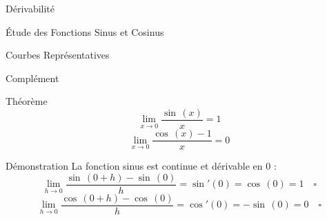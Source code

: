 \documentclass{cours}
\begin{document}
\begin{Gpartie}{Dérivabilité}
\begin{Spartie}{Étude des Fonctions Sinus et Cosinus}
            \begin{SSpartie}{Courbes Représentatives} 
                \begin{center}
                    \parbox{\linewidth}{}
                \end{center}
            \end{SSpartie}
        \end{Spartie}
        \begin{Spartie}{Complément} 
            \begin{SSpartie}{Théorème} 
                \[\lim\limits_{x\to0}\frac{\sin\,(x)}{x}=1\] \[\lim\limits_{x\to0}\frac{\cos\,(x)-1}{x}=0\]
                \begin{SSSpartie}{Démonstration} 
                    La fonction sinus est continue et dérivable en $0$ : \[\lim\limits_{h\to0}\frac{\sin\,(0+h)-\sin\,(0)}{h}=\sin'(0)=\cos\,(0)=1\quad\square\] \[\lim\limits_{h\to0}\frac{\cos\,(0+h)-\cos\,(0)}{h}=\cos'(0)=-\sin\,(0)=0\quad\square\]
                \end{SSSpartie}
            \end{SSpartie}
        \end{Spartie}
    \end{Gpartie}
\end{document}
